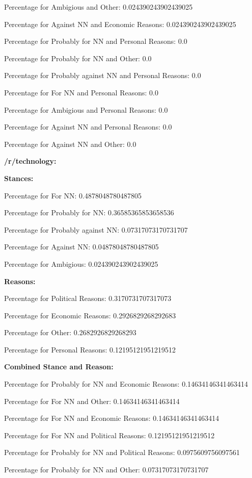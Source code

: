 \documentclass[11pt]{article}
\begin{document}
	Percentage for Ambigious and Other: 0.024390243902439025
	
	Percentage for Against NN and Economic Reasons: 0.024390243902439025
	
	Percentage for Probably for NN and Personal Reasons: 0.0
	
	Percentage for Probably for NN and Other: 0.0
	
	Percentage for Probably against NN and Personal Reasons: 0.0
	
	Percentage for For NN and Personal Reasons: 0.0
	
	Percentage for Ambigious and Personal Reasons: 0.0
	
	Percentage for Against NN and Personal Reasons: 0.0
	
	Percentage for Against NN and Other: 0.0
	
	\textbf{/r/technology:}
	
	\textbf{Stances:}
	
	Percentage for For NN: 0.4878048780487805
	
	Percentage for Probably for NN: 0.36585365853658536
	
	Percentage for Probably against NN: 0.07317073170731707
	
	Percentage for Against NN: 0.04878048780487805
	
	Percentage for Ambigious: 0.024390243902439025
	
	\textbf{Reasons:}
	
	Percentage for Political Reasons: 0.3170731707317073
	
	Percentage for Economic Reasons: 0.2926829268292683
	
	Percentage for Other: 0.2682926829268293
	
	Percentage for Personal Reasons: 0.12195121951219512
	
	\textbf{Combined Stance and Reason:}
	
	Percentage for Probably for NN and Economic Reasons: 0.14634146341463414
	
	Percentage for For NN and Other: 0.14634146341463414
	
	Percentage for For NN and Economic Reasons: 0.14634146341463414
	
	Percentage for For NN and Political Reasons: 0.12195121951219512
	
	Percentage for Probably for NN and Political Reasons: 0.0975609756097561
	
	Percentage for Probably for NN and Other: 0.07317073170731707
	
\end{document}
